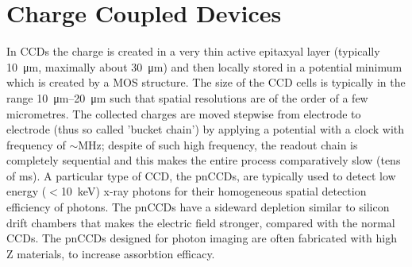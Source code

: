     
\section{Charge Coupled Devices}
In CCDs the charge is created in a very thin active epitaxyal layer (typically \SI{10}{\um}, maximally about \SI{30}{\um}) and then locally stored in a potential minimum which is created by a MOS structure. 
The size of the CCD cells is typically in the range \SIrange{10}{20}{\um} such that spatial resolutions are of the order of a few micrometres.
The collected charges are moved stepwise from electrode to electrode (thus so called 'bucket chain') by applying a potential with a clock with frequency of $\sim$\si{MHz}; despite of such high frequency, the readout chain is completely sequential and this makes the entire process comparatively slow (tens of \si{ms}).
A particular type of CCD, the pnCCDs, are typically used to detect low energy ($<$\SI{10}{keV}) x-ray photons for their homogeneous spatial detection efficiency of photons. The pnCCDs have a sideward depletion similar to silicon drift chambers that makes the electric field stronger, compared with the normal CCDs. 
The pnCCDs designed for photon imaging are often fabricated with high Z materials, to increase assorbtion efficacy.

